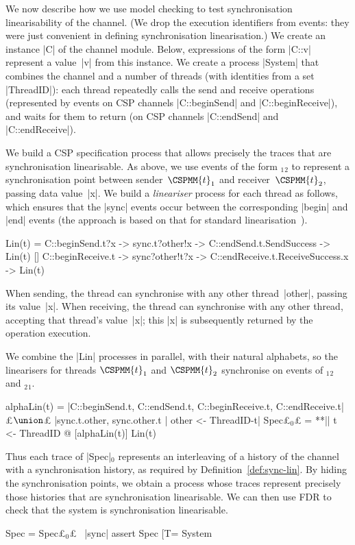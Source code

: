 We now describe how we use model checking to test synchronisation
linearisability of the channel.  (We drop the execution identifiers from
events: they were just convenient in defining synchronisation linearisation.)
We create an instance |C| of the channel module.  Below, expressions of the
form |C::v| represent a value~|v| from this instance.  We create a process
|System| that combines the channel and a number of threads (with identities
from a set |ThreadID|): each thread repeatedly calls the send and receive
operations (represented by events on CSP channels |C::beginSend| and
|C::beginReceive|), and waits for them to return (on CSP channels |C::endSend|
and |C::endReceive|).

We build a CSP specification process that allows precisely the traces that are
synchronisation linearisable.  As above, we use events of the form
$_1$$_2$ to represent a synchronisation point
between sender~$\CSPMM{t}_1$ and receiver~$\CSPMM{t}_2$, passing data
value~|x|.  We build a \emph{lineariser} process for each thread as follows,
which ensures that the |sync| events occur between the corresponding |begin|
and |end| events (the approach is based on that for standard
linearisation~\cite{gavin:lock-free-queue}).
%
\begin{cspm}
Lin(t) = 
  C::beginSend.t?x -> sync.t?other!x -> C::endSend.t.SendSuccess -> Lin(t)
  [] C::beginReceive.t -> sync?other!t?x -> C::endReceive.t.ReceiveSuccess.x -> Lin(t)
\end{cspm}
%
When sending, the thread can synchronise with any other thread~|other|,
passing its value~|x|.  When receiving, the thread can synchronise with any
other thread, accepting that thread's value~|x|; this |x| is subsequently
returned by the operation execution.

We combine the |Lin| processes in parallel, with their natural
alphabets, so the linearisers for threads $\CSPMM{t}_1$ and $\CSPMM{t}_2$
synchronise on events of $_1$$_2$ and
$_2$$_1$.  
%
\begin{cspm}
alphaLin(t) =
  {|C::beginSend.t, C::endSend.t, C::beginReceive.t, C::endReceive.t|} £$\union$£
  {|sync.t.other, sync.other.t | other <- ThreadID-{t}|}
Spec£$_0$£ = **|| t <- ThreadID @ [alphaLin(t)] Lin(t)
\end{cspm} %
%
Thus each trace of |Spec|$_0$ represents an interleaving of a history of the
channel with a synchronisation history, as required by
Definition~\ref{def:sync-lin}.  By hiding the synchronisation points, we
obtain a process whose traces represent precisely those histories that are
synchronisation linearisable.  We can then use FDR to check that the system is
synchronisation linearisable.
%
\begin{cspm}
Spec = Spec£$_0$£ \ {|sync|}
assert Spec [T= System
\end{cspm}


